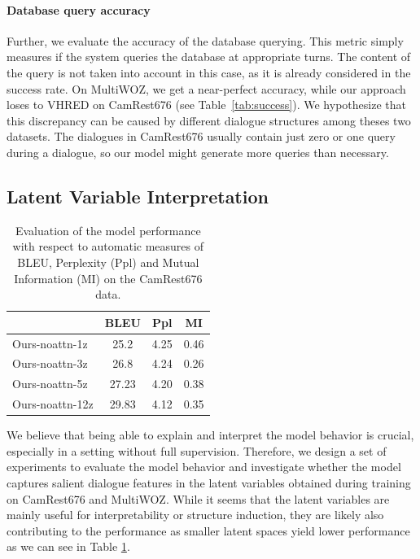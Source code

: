 \paragraph{Database query accuracy}
Further, we evaluate the accuracy of the database querying.
This metric simply measures if the system queries the database at appropriate turns.
The content of the query is not taken into account in this case, as it is already considered in the success rate. On MultiWOZ, we get a near-perfect accuracy, while our approach loses to VHRED on CamRest676 (see Table~\ref{tab:success}).
We hypothesize that this discrepancy can be caused by different dialogue structures among theses two datasets. The dialogues in CamRest676 usually contain just zero or one query during a dialogue, so our model might generate more queries than necessary.

\subsection{Latent Variable Interpretation}
\label{05:sec:latents}
\begin{table}[tp]
    \centering\small
    \begin{tabular}{l|ccc}
      \toprule
      & BLEU & Ppl & MI  \\
    \midrule
    Ours-noattn-1z  & 25.2 & 4.25 & 0.46  \\
    Ours-noattn-3z  & 26.8 & 4.24 & 0.26  \\
    Ours-noattn-5z  & 27.23 & 4.20 & 0.38  \\
    Ours-noattn-12z  & 29.83 & 4.12 & 0.35  \\    

    \bottomrule
  \end{tabular}
  \caption{Evaluation of the model performance with respect to automatic measures of BLEU, Perplexity (Ppl) and Mutual Information (MI) on the CamRest676 data.}
  \label{05:z_counts}
\end{table}
We believe that being able to explain and interpret the model behavior is crucial, especially in a setting without full supervision.
Therefore, we design a set of experiments to evaluate the model behavior and investigate whether the model captures salient dialogue features in the latent variables obtained during training on CamRest676 and MultiWOZ.
While it seems that the latent variables are mainly useful for interpretability or structure induction, they are likely also contributing to the performance as smaller latent spaces yield lower performance as we can see in Table \ref{05:z_counts}.


